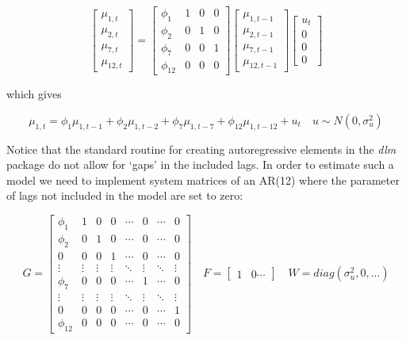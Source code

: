 \documentclass[]{article}
\begin{document}
\[
\begin{bmatrix}
\mu_{1,t} \\ \mu_{2,t} \\ \mu_{7,t} \\ \mu_{12,t} 
\end{bmatrix} =  \begin{bmatrix} 
\phi_{1} & 1 & 0 & 0 \\ 
\phi_{2} & 0 & 1 & 0 \\
\phi_{7} & 0 & 0 & 1 \\
\phi_{12} & 0 & 0 & 0 
\end{bmatrix} \begin{bmatrix} 
\mu_{1,t-1} \\ \mu_{2,t-1} \\ \mu_{7,t-1} \\ \mu_{12,t-1} 
\end{bmatrix} \begin{bmatrix}
u_{t} \\ 0 \\ 0 \\ 0 
\end{bmatrix}
\]

which gives

\[
\mu_{1,t} = \phi_{1} \mu_{1,t-1} + \phi_{2} \mu_{1,t-2} + \phi_{7} \mu_{1,t-7} + \phi_{12} \mu_{1,t-12} + u_{t} \quad u \sim N(0, \sigma^{2}_{u})
\]

Notice that the standard routine for creating autoregressive elements in
the \emph{dlm} package do not allow for `gaps' in the included lags. In
order to estimate such a model we need to implement system matrices of
an AR(12) where the parameter of lags not included in the model are set
to zero:

\[
G = \begin{bmatrix} 
\phi_{1}  & 1      & 0      & 0      & \cdots & 0      & \cdots & 0      \\
\phi_{2}  & 0      & 1      & 0      & \cdots & 0      & \cdots & 0      \\
0         & 0      & 0      & 1      & \cdots & 0      & \cdots & 0      \\
\vdots    & \vdots & \vdots & \vdots & \ddots & \vdots & \ddots & \vdots \\
\phi_{7}  & 0      & 0      & 0      & \cdots & 1      & \cdots & 0      \\
\vdots    & \vdots & \vdots & \vdots & \ddots & \vdots & \ddots & \vdots \\
0         & 0      & 0      & 0      & \cdots & 0      & \cdots & 1      \\
\phi_{12} & 0      & 0      & 0      & \cdots & 0      & \cdots & 0
\end{bmatrix} \quad F = \begin{bmatrix} 1 & 0 \cdots \end{bmatrix} \quad W = diag(\sigma_{u}^{2}, 0, ...)
\]
\end{document}
